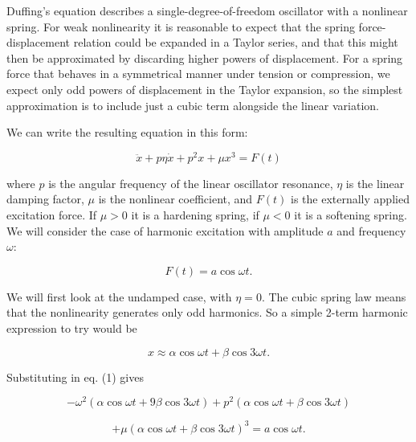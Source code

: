   Duffing's equation describes a single-degree-of-freedom oscillator with a 
  nonlinear spring. For weak nonlinearity it is reasonable to expect that the 
  spring force-displacement relation could be expanded in a Taylor series, and 
  that this might then be approximated by discarding higher powers of 
  displacement. For a spring force that behaves in a symmetrical manner under 
  tension or compression, we expect only odd powers of displacement in the 
  Taylor expansion, so the simplest approximation is to include just a cubic 
  term alongside the linear variation. 

  We can write the resulting equation in this form: 

  \begin{equation*}\ddot{x}+p \eta \dot{x} +p^2 x +\mu x^3 = F(t) 
  \tag{1}\end{equation*} 

  \noindent{}where $p$ is the angular frequency of the linear oscillator 
  resonance, $\eta$ is the linear damping factor, $\mu$ is the nonlinear 
  coefficient, and $F(t)$ is the externally applied excitation force. If $\mu > 
  0$ it is a hardening spring, if $\mu < 0$ it is a softening spring. We will 
  consider the case of harmonic excitation with amplitude $a$ and frequency 
  $\omega$: 

  \begin{equation*}F(t)=a \cos \omega t . \tag{2}\end{equation*} 

  We will first look at the undamped case, with $\eta =0$. The cubic spring law 
  means that the nonlinearity generates only odd harmonics. So a simple 2-term 
  harmonic expression to try would be 

  \begin{equation*}x \approx \alpha \cos \omega t + \beta \cos 3\omega t . 
  \tag{3}\end{equation*} 

  Substituting in eq. (1) gives 

  \begin{equation*}-\omega^2 \left(\alpha \cos \omega t + 9\beta \cos 3\omega 
  t\right) + p^2 \left(\alpha \cos \omega t + \beta \cos 3\omega 
  t\right)\end{equation*} 

  \begin{equation*}+\mu \left(\alpha \cos \omega t + \beta \cos 3\omega 
  t\right)^3 = a \cos \omega t. \tag{4}\end{equation*} 

